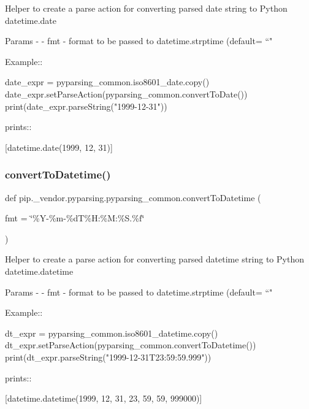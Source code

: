 \begin{DoxyVerb}Helper to create a parse action for converting parsed date string to Python datetime.date

Params -
 - fmt - format to be passed to datetime.strptime (default= ``"%

Example::

    date_expr = pyparsing_common.iso8601_date.copy()
    date_expr.setParseAction(pyparsing_common.convertToDate())
    print(date_expr.parseString("1999-12-31"))

prints::

    [datetime.date(1999, 12, 31)]
\end{DoxyVerb}
 \mbox{\label{classpip_1_1__vendor_1_1pyparsing_1_1pyparsing__common_a63ddf1630dca0a46873eaee404d0264e}} 
\subsubsection{\texorpdfstring{convert\+To\+Datetime()}{convertToDatetime()}}
{\footnotesize\ttfamily def pip.\+\_\+vendor.\+pyparsing.\+pyparsing\+\_\+common.\+convert\+To\+Datetime (\begin{DoxyParamCaption}\item[{}]{fmt = {\ttfamily \char`\"{}\%Y-\/\%m-\/\%dT\%H\+:\%M\+:\%S.\%f\char`\"{}} }\end{DoxyParamCaption})\hspace{0.3cm}{\ttfamily [static]}}

\begin{DoxyVerb}Helper to create a parse action for converting parsed
datetime string to Python datetime.datetime

Params -
 - fmt - format to be passed to datetime.strptime (default= ``"%

Example::

    dt_expr = pyparsing_common.iso8601_datetime.copy()
    dt_expr.setParseAction(pyparsing_common.convertToDatetime())
    print(dt_expr.parseString("1999-12-31T23:59:59.999"))

prints::

    [datetime.datetime(1999, 12, 31, 23, 59, 59, 999000)]
\end{DoxyVerb}
 \mbox{\label{classpip_1_1__vendor_1_1pyparsing_1_1pyparsing__common_addd017ae430585480cddba7df09fcbed}} 
